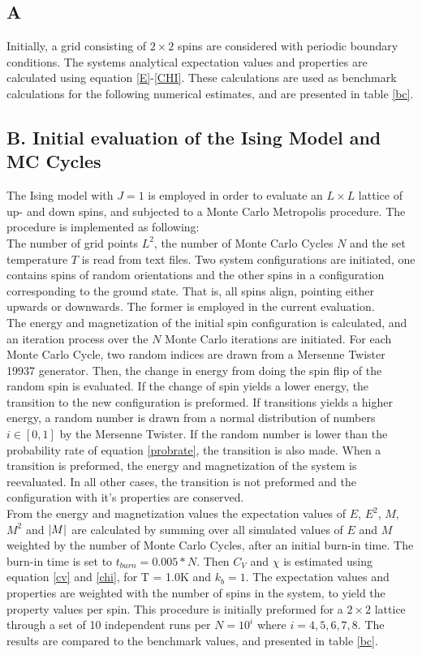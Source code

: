 \documentclass[%
reprint,nofootinbib,
amsmath,amssymb,
aps,
]{revtex4-1}
\begin{document}
\subsection{A} \noindent 
Initially, a grid consisting of $2\times 2$ spins are considered with periodic boundary conditions. The systems analytical expectation values and properties are calculated using equation \ref{E}-\ref{CHI}. These calculations are used as benchmark calculations for the following numerical estimates, and are presented in table \ref{bc}.

\subsection*{B. Initial evaluation of the Ising Model and MC Cycles}
The Ising model with $J=1$ is employed in order to evaluate an $L\times L$ lattice of up- and down spins, and subjected to a Monte Carlo Metropolis procedure. The procedure is implemented as following:\\
The number of grid points $L^2$, the number of Monte Carlo Cycles $N$ and the set temperature $T$ is read from text files. Two system configurations are initiated, one contains spins of random orientations and the other spins in a configuration corresponding to the ground state. That is, all spins align, pointing either upwards or downwards. The former is employed in the current evaluation. \\
The energy and magnetization of the initial spin configuration is calculated, and an iteration process over the $N$ Monte Carlo iterations are initiated. For each Monte Carlo Cycle, two random indices are drawn from a Mersenne Twister 19937 generator. Then, the change in energy from doing the spin flip of the random spin is evaluated. If the change of spin yields a lower energy, the transition to the new configuration is preformed. If transitions yields a higher energy, a random number is drawn from a normal distribution of numbers $i\in[0,1]$ by the Mersenne Twister. If the random number is lower than the probability rate of equation \ref{probrate}, the transition is also made. When a transition is preformed, the energy and magnetization of the system is reevaluated. In all other cases, the transition is not preformed and the configuration with it's properties are conserved. \\ \indent 
From the energy and magnetization values the expectation values of $E$, $E^2$, $M$, $M^2$ and $\abs{M}$ are calculated by summing over all simulated values of $E$ and $M$ weighted by the number of Monte Carlo Cycles, after an initial burn-in time. The burn-in time is set to $t_{burn} = 0.005*N$. Then $C_V$ and $\chi$ is estimated using equation  \ref{cv} and \ref{chi}, for T = 1.0K and $k_b=1$. The expectation values and properties are weighted with the number of spins in the system, to yield the property values per spin. This procedure is initially preformed for a $2\times 2$ lattice through a set  of 10 independent runs per $N=10^i$ where $i = 4, 5, 6, 7, 8$. The results are compared to the benchmark values, and presented in table \ref{bc}.
\end{document}
